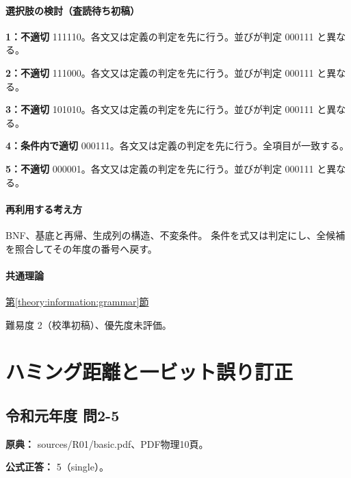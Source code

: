 \paragraph{選択肢の検討（査読待ち初稿）}\mbox{}\par

\noindent\textbf{1：不適切} 111110。各文又は定義の判定を先に行う。並びが判定 000111 と異なる。\par

\noindent\textbf{2：不適切} 111000。各文又は定義の判定を先に行う。並びが判定 000111 と異なる。\par

\noindent\textbf{3：不適切} 101010。各文又は定義の判定を先に行う。並びが判定 000111 と異なる。\par

\noindent\textbf{4：条件内で適切} 000111。各文又は定義の判定を先に行う。全項目が一致する。\par

\noindent\textbf{5：不適切} 000001。各文又は定義の判定を先に行う。並びが判定 000111 と異なる。\par

\paragraph{再利用する考え方} BNF、基底と再帰、生成列の構造、不変条件。 条件を式又は判定にし、全候補を照合してその年度の番号へ戻す。

\paragraph{共通理論} \hyperref[theory:information:grammar]{第\ref*{theory:information:grammar}節}

\par 難易度 2（校準初稿）、優先度未評価。

\section{ハミング距離と一ビット誤り訂正}

\subsection{令和元年度 問2-5}
\label{q:r01-reg-basic-2-5}

\noindent\textbf{原典：} sources/R01/basic.pdf、PDF物理10頁。

\textbf{公式正答：} 5（single）。

